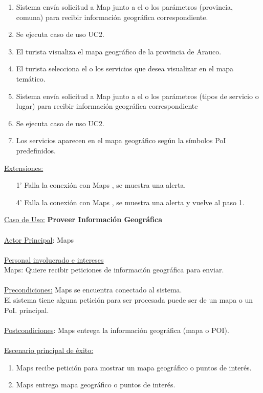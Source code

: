 \documentclass[12pt]{article}
\begin{document}
\begin{enumerate}
\item Sistema envía solicitud a Map junto a el o los parámetros (provincia, comuna) para recibir información geográfica correspondiente.
\item Se ejecuta caso de uso UC2.
\item El turista visualiza el mapa geográfico de la provincia de Arauco.
\item El turista selecciona el o los servicios que desea visualizar en el mapa temático.
\item Sistema envía solicitud a Map junto a el o los parámetros (tipos de servicio o lugar) para recibir información geográfica correspondiente
\item Se ejecuta caso de uso UC2.
\item Los servicios aparecen en el mapa geográfico según la símbolos PoI predefinidos.
\end{enumerate}
\underline{Extensiones:}
\begin{enumerate}
\item [1’] Falla la conexión con Maps , se muestra una alerta.
\item [4’] Falla la conexión con Maps , se muestra una alerta  y vuelve al paso 1.
\end{enumerate}
\underline{Caso de Uso:} \textbf{Proveer Información Geográfica} \\\\\underline{Actor Principal}: Maps\\\\\underline{Personal involucrado e intereses}\\Maps: Quiere recibir peticiones de información geográfica para enviar.\\\\\underline{Precondiciones:} Maps se encuentra conectado al sistema.\\El sistema tiene alguna petición para ser procesada puede ser de un mapa o un PoI.  principal.\\\\\underline{Postcondiciones}: Maps entrega la información geográfica (mapa o POI).\\\\\underline{Escenario principal de éxito:}
\begin{enumerate}
\item Maps recibe petición para mostrar un mapa geográfico o puntos de interés.
\item Maps entrega mapa geográfico o puntos de interés.
\end{enumerate}
\end{document}
